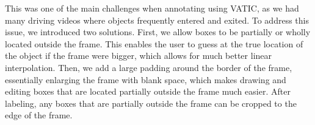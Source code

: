 This was one of the main challenges when annotating using VATIC, as we had many driving videos where objects frequently entered and exited.
To address this issue, we introduced two solutions.
First, we allow boxes to be partially or wholly located outside the frame.
This enables the user to guess at the true location of the object if the frame were bigger, which allows for much better linear interpolation. %
Then, we add a large padding around the border of the frame, essentially enlarging the frame with blank space, which makes drawing and editing boxes that are located partially outside the frame much easier.
After labeling, any boxes that are partially outside the frame can be cropped to the edge of the frame.










